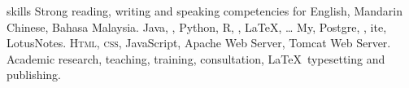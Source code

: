 
\begin{rubric}{skills}
\entry*[Languages]
	Strong reading, writing and speaking competencies for English, Mandarin Chinese, Bahasa Malaysia.
	Java, , Python, R, , \LaTeX, \ldots
\entry*[Databases]
	My, Postgre, , ite, LotusNotes.
	\textsc{Html, css}, JavaScript, Apache Web Server, Tomcat Web Server.
\entry*[Misc.]
	Academic research, teaching, training, consultation, \LaTeX\ typesetting and publishing.
\end{rubric}
